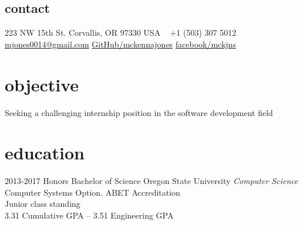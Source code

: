 \documentclass[print]{friggeri-cv} %
\begin{document}


\begin{aside} %
\section{contact}
223 NW 15th St.
Corvallis, OR 97330
USA
~
+1 (503) 307 5012
~
\href{mailto:mjones0014@gmail.com}{mjones0014@gmail.com}
\href{https://github.com/mckennajones}{GitHub/mckennajones}
\href{http://facebook.com/mckjns}{facebook/mckjns}
\end{aside}



\section{objective}
Seeking a challenging internship position in the software development field 

\section{education}

\begin{entrylist}


\entry
{2013-2017}
{Honors Bachelor {\normalfont of Science}}
{Oregon State University}
{\emph{Computer Science} \\ Computer Systems Option. ABET Accreditation \\
Junior class standing\\3.31 Cumulative GPA -- 3.51 Engineering GPA}


\end{entrylist}

\end{document}
